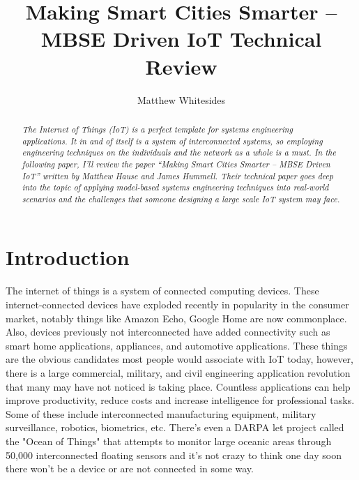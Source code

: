 \documentclass[11pt]{asme2ej}
\title{Making Smart Cities Smarter – MBSE Driven IoT Technical Review}
\author{Matthew Whitesides
    \affiliation{
	Missouri University of Science and Technology\\
    mbwxd4@umsystem.edu\\
    \today
    }	
}
\begin{document}
\maketitle

\begin{abstract}
{\it 
The Internet of Things (IoT) is a perfect template for systems engineering applications. It in and of itself is a system of interconnected systems, so employing engineering techniques on the individuals and the network as a whole is a must. In the following paper, I’ll review the paper “Making Smart Cities Smarter – MBSE Driven IoT” written by Matthew Hause and James Hummell. Their technical paper goes deep into the topic of applying model-based systems engineering techniques into real-world scenarios and the challenges that someone designing a large scale IoT system may face.
} 
\end{abstract}

\begin{nomenclature}
\end{nomenclature}

\section{Introduction}

The internet of things is a system of connected computing devices. These internet-connected devices have exploded recently in popularity in the consumer market, notably things like Amazon Echo, Google Home are now commonplace.
Also, devices previously not interconnected have added connectivity such as smart home applications, appliances, and automotive applications. 
These things are the obvious candidates most people would associate with IoT today, however, there is a large commercial, military, and civil engineering application revolution that many may have not noticed is taking place.
Countless applications can help improve productivity, reduce costs and increase intelligence for professional tasks. Some of these include interconnected manufacturing equipment, military surveillance, robotics, biometrics, etc.
There's even a DARPA let project called the "Ocean of Things" that attempts to monitor large oceanic areas through 50,000 interconnected floating sensors and it's not crazy to think one day soon there won't be a device or are not connected in some way.\\
\end{document}
